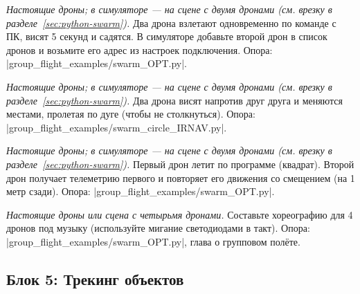 \begin{taskbox}
\emph{Настоящие дроны; в симуляторе --- на сцене с двумя дронами (см. врезку в разделе~\ref{sec:python-swarm}).} Два дрона взлетают одновременно по команде с ПК, висят 5 секунд и садятся. В симуляторе добавьте второй дрон в список дронов и возьмите его адрес из настроек подключения.
Опора: \fpath|group_flight_examples/swarm_OPT.py|.
\end{taskbox}

\begin{taskbox}[(П) Карусель]
\emph{Настоящие дроны; в симуляторе --- на сцене с двумя дронами (см. врезку в разделе~\ref{sec:python-swarm}).} Два дрона висят напротив друг друга и меняются местами, пролетая по дуге (чтобы не столкнуться).
Опора: \fpath|group_flight_examples/swarm_circle_IRNAV.py|.
\end{taskbox}

\begin{taskbox}
\emph{Настоящие дроны; в симуляторе --- на сцене с двумя дронами (см. врезку в разделе~\ref{sec:python-swarm}).} Первый дрон летит по программе (квадрат). Второй дрон получает телеметрию первого и повторяет его движения со смещением (на 1 метр сзади).
Опора: \fpath|group_flight_examples/swarm_OPT.py|.
\end{taskbox}

\begin{taskbox}
\emph{Настоящие дроны или сцена с четырьмя дронами.} Составьте хореографию для 4 дронов под музыку (используйте мигание светодиодами в такт).
Опора: \fpath|group_flight_examples/swarm_OPT.py|, глава о групповом полёте.
\end{taskbox}

\subsection{Блок 5: Трекинг объектов}

